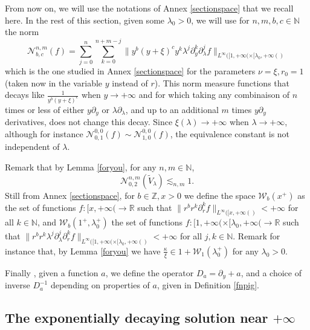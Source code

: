\documentclass[11 pt]{amsart}
\theoremstyle{definition}
\theoremstyle{remark}
\numberwithin{equation}{section}
\begin{document}
From now on, we will use the notations of Annex \ref{sectionspace} that we
recall here. In the rest of this section, given some $\lambda_0 > 0$, we will
use for $n, m, b, c \in \mathbb{N}$ the norm
\[ \mathcal{N}_{b, c}^{n, m} (f) = \sum_{j = 0}^n \sum_{k = 0}^{n + m - j} \|
   y^b (y + \xi)^c y^k \lambda^j \partial_y^k \partial_{\lambda}^j f
   \|_{L^{\infty} ([1, + \infty (\times [\lambda_0, + \infty ()} \]
which is the one studied in Annex \ref{sectionspace} for the parameters $\nu
= \xi, r_0 = 1$ (taken now in the variable $y$ instead of $r$). This norm
measure functions that decays like $\frac{1}{y^b (y + \xi)^c}$ when $y
\rightarrow + \infty$ and for which taking any combinaison of $n$ times or
less of either $y \partial_y$ or $\lambda \partial_{\lambda}$, and up to an
additional $m$ times $y \partial_y$ derivatives, does not change this decay.
Since $\xi (\lambda) \rightarrow + \infty$ when $\lambda \rightarrow +
\infty$, although for instance $\mathcal{N}_{0, 1}^{0, 0} (f) \sim
\mathcal{N}_{1, 0}^{0, 0} (f)$, the equivalence constant is not independent of
$\lambda$.

Remark that by Lemma \ref{foryou}, for any $n, m \in \mathbb{N}$,
\begin{equation}
  \mathcal{N}_{0, 2}^{n, m} (\widetilde{V}_{\lambda}) \lesssim_{n, m} 1.
  \label{dusk0}
\end{equation}
Still from Annex \ref{sectionspace}, for $b \in \mathbb{Z},x>0$ we define the
space $\mathcal{W}_b (x^+)$ as the set of functions $f : [x, + \infty
(\rightarrow \mathbb{R}$ such that $\| r^b r^k \partial_r^k f \|_{L^{\infty}
([x, + \infty ()} < + \infty$ for all $k \in \mathbb{N}$, and $\mathcal{W}_b
(1^+, \lambda_0^+)$ the set of functions $f : [1, + \infty (\times [\lambda_0,
+ \infty (\rightarrow \mathbb{R}$ such that $\| r^b r^k \lambda^j
\partial_{\lambda}^j \partial_r^k f \|_{L^{\infty} ([1, + \infty ( \times[\lambda_0 ,+\infty()} < +
\infty$ for all $j, k \in \mathbb{N}$. Remark for instance that, by Lemma \ref{foryou} we have $\frac{\kappa}{\xi} \in 1+ \mathcal{W}_1(\lambda_0^+)$ for any $\lambda_0>0$.

Finally , given a function $a$, we define the operator $D_a = \partial_y + a$,
and a choice of inverse $D_a^{- 1}$ depending on properties of $a$, given in
Definition \ref{fnpig}.

\subsection{The exponentially decaying solution near $+\infty$}
\end{document}
